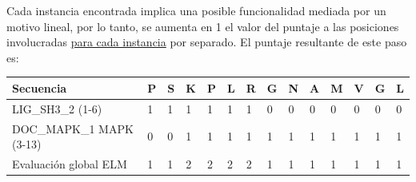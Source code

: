 Cada instancia encontrada implica una posible funcionalidad mediada por un motivo lineal, por lo tanto, se aumenta en 1 el valor del puntaje a las posiciones involucradas \underline{para cada instancia} por separado.
El puntaje resultante de este paso es:

\vspace{0.5cm}
\begin{tabular}{llllllllllllll} 
\hline
Secuencia & \textbf{P} & \textbf{S} & \textbf{K} & \textbf{P} & \textbf{L} & \textbf{R} & \textbf{G} & \textbf{N} & \textbf{A} & \textbf{M} & \textbf{V} & \textbf{G} & \textbf{L} \\ \hline
LIG\_SH3\_2 (1-6) 		& 1 & 1 & 1 & 1 & 1 & 1 & 0 & 0 & 0 & 0 & 0 & 0 & 0\\ \hline
DOC\_MAPK\_1 MAPK (3-13)  	& 0 & 0 & 1 & 1 & 1 & 1 & 1 & 1 & 1 & 1 & 1 & 1 & 1 \\ \hline
Evaluación global ELM 		& 1 & 1 & 2 & 2 & 2 & 2 & 1 & 1 & 1 & 1 & 1 & 1 & 1\\ \hline
\end{tabular}



























